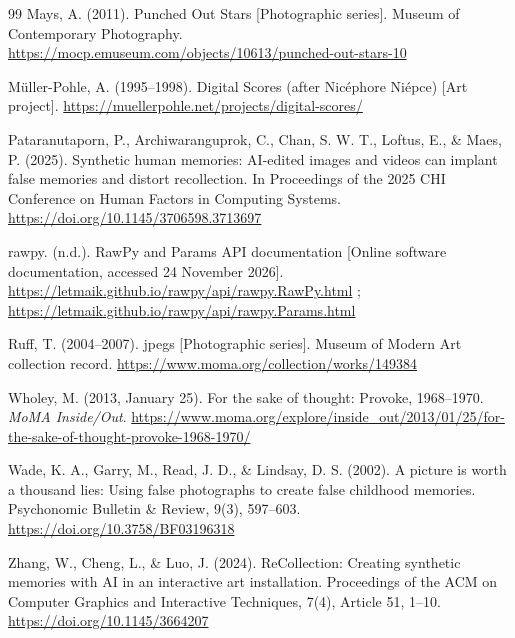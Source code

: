 \documentclass[manuscript,review,anonymous,authoryear]{acmart}
\begin{document}
\begin{thebibliography}{99}
 Mays, A. (2011). Punched Out Stars [Photographic series]. Museum of Contemporary Photography. \url{https://mocp.emuseum.com/objects/10613/punched-out-stars-10}

 Müller-Pohle, A. (1995--1998). Digital Scores (after Nicéphore Niépce) [Art project]. \url{https://muellerpohle.net/projects/digital-scores/}

 Pataranutaporn, P., Archiwaranguprok, C., Chan, S. W. T., Loftus, E., \& Maes, P. (2025). Synthetic human memories: AI-edited images and videos can implant false memories and distort recollection. In Proceedings of the 2025 CHI Conference on Human Factors in Computing Systems. \url{https://doi.org/10.1145/3706598.3713697}

 rawpy. (n.d.). RawPy and Params API documentation [Online software documentation, accessed 24 November 2026]. \url{https://letmaik.github.io/rawpy/api/rawpy.RawPy.html} ; \url{https://letmaik.github.io/rawpy/api/rawpy.Params.html}

 Ruff, T. (2004--2007). jpegs [Photographic series]. Museum of Modern Art collection record. \url{https://www.moma.org/collection/works/149384}

 Wholey, M. (2013, January 25). For the sake of thought: Provoke, 1968--1970. \textit{MoMA Inside/Out}. \url{https://www.moma.org/explore/inside_out/2013/01/25/for-the-sake-of-thought-provoke-1968-1970/}

 Wade, K. A., Garry, M., Read, J. D., \& Lindsay, D. S. (2002). A picture is worth a thousand lies: Using false photographs to create false childhood memories. Psychonomic Bulletin \& Review, 9(3), 597--603. \url{https://doi.org/10.3758/BF03196318}

 Zhang, W., Cheng, L., \& Luo, J. (2024). ReCollection: Creating synthetic memories with AI in an interactive art installation. Proceedings of the ACM on Computer Graphics and Interactive Techniques, 7(4), Article 51, 1--10. \url{https://doi.org/10.1145/3664207}

\end{thebibliography}
\end{document}
